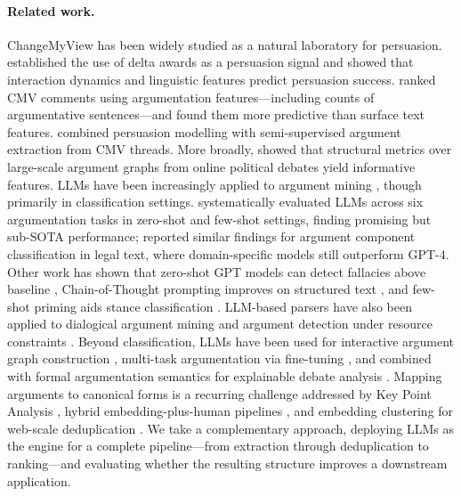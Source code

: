 \paragraph{Related work.} ChangeMyView has been widely studied as a natural laboratory for persuasion. \citet{tan-etal-2016-winning} established the use of delta awards as a persuasion signal and showed that interaction dynamics and linguistic features predict persuasion success. \citet{wei-etal-2016-post} ranked CMV comments using argumentation features---including counts of argumentative sentences---and found them more predictive than surface text features. \citet{dutta-etal-2019-changing} combined persuasion modelling with semi-supervised argument extraction from CMV threads. More broadly, \citet{lawrence-reed-2017-complex} showed that structural metrics over large-scale argument graphs from online political debates yield informative features. LLMs have been increasingly applied to argument mining \citep[for a recent survey, see][]{li-etal-2025-llm-am-survey}, though primarily in classification settings. \citet{chen-etal-2024-exploring-potential} systematically evaluated LLMs across six argumentation tasks in zero-shot and few-shot settings, finding promising but sub-SOTA performance; \citet{alzubaer-etal-2023-legal-am} reported similar findings for argument component classification in legal text, where domain-specific models still outperform GPT-4. Other work has shown that zero-shot GPT models can detect fallacies above baseline \citep{ruiz-dolz-lawrence-2023-gpt}, Chain-of-Thought prompting improves on structured text \citep{bytyqi-hautli-janisz-2025-reasoning}, and few-shot priming aids stance classification \citep{ajjour-wachsmuth-2025-exploring}. LLM-based parsers have also been applied to dialogical argument mining \citep{saha-srihari-2024-turiya} and argument detection under resource constraints \citep{kashefi-etal-2023-argument}. Beyond classification, LLMs have been used for interactive argument graph construction \citep{lenz-bergmann-2024-arguemapper}, multi-task argumentation via fine-tuning \citep{savingy-yun-2025-amelia}, and combined with formal argumentation semantics for explainable debate analysis \citep{alfano-etal-2025-fakb}. Mapping arguments to canonical forms is a recurring challenge addressed by Key Point Analysis \citep{bar-haim-etal-2020-arguments}, hybrid embedding-plus-human pipelines \citep{vandermeer-etal-2024-hyena}, and embedding clustering for web-scale deduplication \citep{abbas2023semdedup}. We take a complementary approach, deploying LLMs as the engine for a complete pipeline---from extraction through deduplication to ranking---and evaluating whether the resulting structure improves a downstream application.
